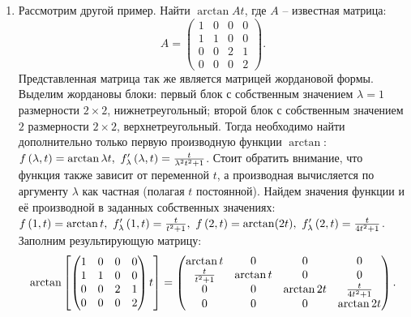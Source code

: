 \begin{enumerate}
			\item Рассмотрим другой пример. Найти $\arctan{At}$, где $A$ -- известная матрица:
				\[ A = \begin{pmatrix} 1 & 0 & 0 & 0 \\ 1 & 1 & 0 & 0 \\ 0 & 0 & 2 & 1 \\ 0 & 0 & 0 & 2 \end{pmatrix}. \]
				Представленная матрица так же является матрицей жордановой формы. Выделим жордановы блоки: первый блок с собственным значением $\lambda = 1$ размерности $2 \times 2$, нижнетреугольный; второй блок с собственным значением $2$ размерности $2 \times 2$, верхнетреугольный. Тогда необходимо найти дополнительно только первую производную функции $\arctan$: $f\left( \lambda, t \right) = \arctan{\lambda t}, ~ f'_{\lambda} \left( \lambda, t \right) = \frac{t}{\lambda^2 t^2 + 1}$. Стоит обратить внимание, что функция также зависит от переменной $t$, а производная вычисляется по аргументу $\lambda$ как частная (полагая $t$ постоянной). Найдем значения функции и её производной в заданных собственных значениях: $f\left( 1, t \right) = \arctan{t}, ~ f'_{\lambda}\left( 1, t \right) = \frac{t}{t^2 + 1}, ~ f\left( 2, t \right) = \arctan(2t), ~ f'_{\lambda}\left( 2, t \right) = \frac{t}{4t^2 + 1}$. Заполним результирующую матрицу:
				\[ \arctan\left[ \begin{pmatrix} 1 & 0 & 0 & 0 \\ 1 & 1 & 0 & 0 \\ 0 & 0 & 2 & 1 \\ 0 & 0 & 0 & 2 \end{pmatrix} t \right] = \begin{pmatrix} \arctan{t} & 0 & 0 & 0 \\ \frac{t}{t^2 + 1} & \arctan{t} & 0 & 0 \\ 0 & 0 & \arctan{2t} & \frac{t}{4t^2 + 1} \\ 0 & 0 & 0 & \arctan{2t} \end{pmatrix}. \]
		
		\end{enumerate}
